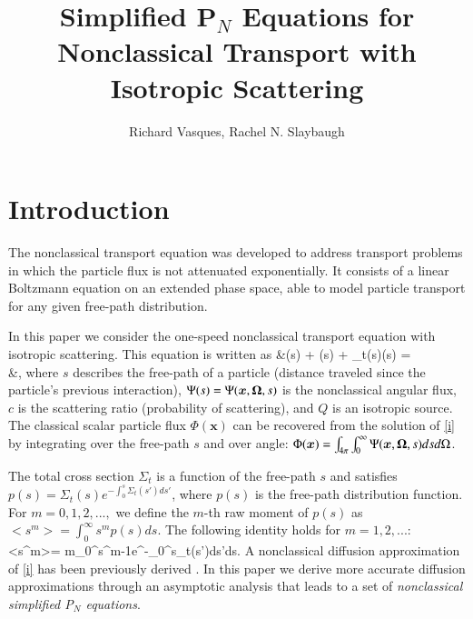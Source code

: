 \documentclass{anstrans}
\title{Simplified P$_N$ Equations for Nonclassical Transport with Isotropic Scattering}
\author{Richard Vasques, Rachel N. Slaybaugh}
\institute{
Department of Nuclear Engineering, University of California, Berkeley, Berkeley, CA 94720-1730}
\def\bal#1\nal{\begin{align}#1\end{align}}
\newcommand{\f}{\frac}
\newcommand{\ux}{{\bm x}}
\newcommand{\unab}{{\bf \nabla}}
\newcommand{\bg}{\big>}
\newcommand{\bl}{\big<}
\newcommand{\uom}{{\bf \Omega}}
\begin{document}
\section{Introduction}

The nonclassical transport equation \cite{larvas11} was developed to address transport problems in which the particle flux is not attenuated exponentially.
It consists of a linear Boltzmann equation on an extended phase space, able to model particle transport for any given free-path distribution.

In this paper we consider the one-speed nonclassical transport equation with isotropic scattering. This equation is written as \cite{larvas11}
\bal\label{i}
&\f{\partial \Psi}{\partial s}(s) + \uom\cdot\unab\Psi(s) + \Sigma_t(s)\Psi(s) =\\
&\qquad \f{\delta(s)}{4\pi}\left[\int_{4\pi}\int_0^\infty c\Sigma_t(s')\Psi(\ux,\uom',s')ds'd\Omega' + Q(\ux)\right],\nonumber
\nal
where $s$ describes the free-path of a particle (distance traveled since the particle's previous interaction), $\Psi(s)=\Psi(\ux,\uom,s)$ is the nonclassical angular flux, $c$ is the scattering ratio (probability of scattering), and $Q$ is an isotropic source.
The classical scalar particle flux $\Phi(\ux)$ can be recovered from the solution of \cref{i} by integrating over the free-path $s$ and over angle:
$\Phi(\ux) = \int_{4\pi}\int_0^\infty\Psi(\ux,\uom,s)dsd\Omega$.

The total cross section $\Sigma_t$ is a function of the free-path $s$ and satisfies $p(s)= \Sigma_t(s)e^{-\int_0^s\Sigma_t(s')ds'}$, where $p(s)$ is the free-path distribution function.
For $m=0, 1, 2,...,$ we define the $m$-th raw moment of $p(s)$ as
$\bl s^m\bg = \int_0^\infty s^mp(s)ds.$
The following identity holds for $m=1,2,...$: 
\bal\label{ii}
\bl s^m\bg = m\int_0^\infty s^{m-1}e^{-\int_0^s\Sigma_t(s')ds'}ds.
\nal
A nonclassical diffusion approximation of \cref{i} has been previously derived \cite{larvas11}.
In this paper we derive more accurate diffusion approximations through an asymptotic analysis that leads to a set of \textit{nonclassical simplified P$_N$ equations}.

\end{document}
